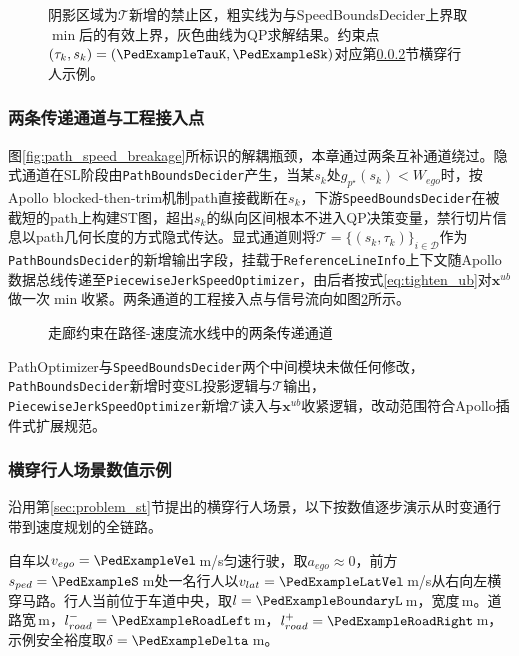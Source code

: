 \begin{figure}[htbp]
\centering
{}
\caption{时间有效性约束在ST图中的几何表示}
\caption*{\scriptsize 阴影区域为$\mathcal{T}$新增的禁止区，粗实线为与SpeedBoundsDecider上界取$\min$后的有效上界，灰色曲线为QP求解结果。约束点$(\tau_k,s_k)=(\PedExampleTauK,\PedExampleSk)$对应第\ref{sec:crossing_ped_numeric_example}节横穿行人示例。}
\label{fig:st_constraint}
\end{figure}

\subsubsection{两条传递通道与工程接入点}
\label{sec:dual_channel}
图\ref{fig:path_speed_breakage}所标识的解耦瓶颈，本章通过两条互补通道绕过。隐式通道在SL阶段由\texttt{PathBoundsDecider}产生，当某$s_k$处$g_{p^\star}(s_k)<W_{ego}$时，按Apollo blocked-then-trim机制path直接截断在$s_k$，下游\texttt{SpeedBoundsDecider}在被截短的path上构建ST图，超出$s_k$的纵向区间根本不进入QP决策变量，禁行切片信息以path几何长度的方式隐式传达。显式通道则将$\mathcal{T}=\{(s_k,\tau_k)\}_{i\in\mathcal{D}}$作为\texttt{PathBoundsDecider}的新增输出字段，挂载于\texttt{ReferenceLineInfo}上下文随Apollo数据总线传递至\texttt{PiecewiseJerkSpeedOptimizer}，由后者按式\eqref{eq:tighten_ub}对$\mathbf{x}^{ub}$做一次$\min$收紧。两条通道的工程接入点与信号流向如图\ref{fig:dataflow}所示。

\begin{figure}[htbp]
\centering
{}
\caption{走廊约束在路径-速度流水线中的两条传递通道}
\label{fig:dataflow}
\end{figure}

PathOptimizer与\texttt{SpeedBoundsDecider}两个中间模块未做任何修改，\texttt{PathBoundsDecider}新增时变SL投影逻辑与$\mathcal{T}$输出，\texttt{PiecewiseJerkSpeedOptimizer}新增$\mathcal{T}$读入与$\mathbf{x}^{ub}$收紧逻辑，改动范围符合Apollo插件式扩展规范。

\subsubsection{横穿行人场景数值示例}
\label{sec:crossing_ped_numeric_example}
沿用第\ref{sec:problem_st}节提出的横穿行人场景，以下按数值逐步演示从时变通行带到速度规划的全链路。

自车以$v_{ego} = \PedExampleVel$\,m/s匀速行驶，取$a_{ego} \approx 0$，前方$s_{ped} = \PedExampleS$\,m处一名行人以$v_{lat} = \PedExampleLatVel$\,m/s从右向左横穿马路。行人当前位于车道中央，取$l = \PedExampleBoundaryL$\,m，宽度\PedExamplePedWidth\,m。道路宽\PedExampleRoadWidth\,m，$l_{road}^{-} = \PedExampleRoadLeft$\,m，$l_{road}^{+} = \PedExampleRoadRight$\,m，示例安全裕度取$\delta = \PedExampleDelta$\,m。

